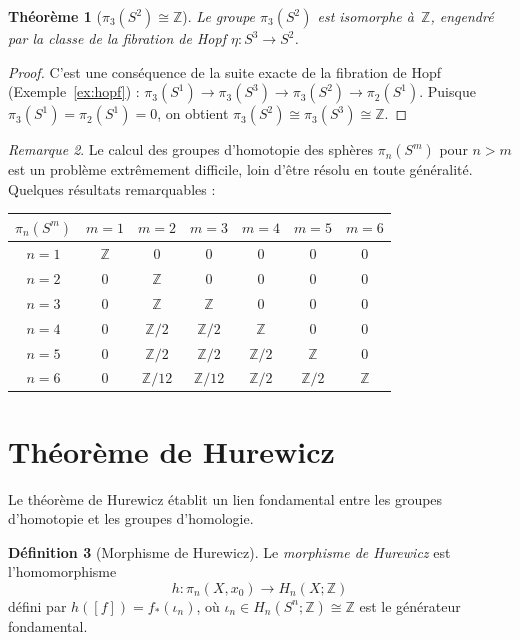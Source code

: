 \documentclass[12pt,a4paper,openany]{book}
\theoremstyle{definition}
\newtheorem{definition}{Définition}[chapter]
\theoremstyle{plain}
\newtheorem{theoreme}[definition]{Théorème}
\theoremstyle{remark}
\newtheorem{remarque}[definition]{Remarque}
\newcommand{\Z}{\mathbb{Z}}
\begin{document}
\begin{theoreme}[$\pi_3(S^2) \cong \Z$]\label{thm:pi3-s2}
  Le groupe $\pi_3(S^2)$ est isomorphe à~$\Z$, engendré par la classe de la
  fibration de Hopf $\eta \colon S^3 \to S^2$.
\end{theoreme}

\begin{proof}
  C'est une conséquence de la suite exacte de la fibration de Hopf
  (Exemple~\ref{ex:hopf}) :
  $\pi_3(S^1) \to \pi_3(S^3) \to \pi_3(S^2) \to \pi_2(S^1)$.
  Puisque $\pi_3(S^1) = \pi_2(S^1) = 0$, on obtient
  $\pi_3(S^2) \cong \pi_3(S^3) \cong \Z$.
\end{proof}

\begin{remarque}\label{rem:homotopie-spheres-difficile}
  Le calcul des groupes d'homotopie des sphères $\pi_n(S^m)$ pour $n > m$ est un
  problème extrêmement difficile, loin d'être résolu en toute généralité. Quelques
  résultats remarquables :
  \begin{center}
    \renewcommand{\arraystretch}{1.3}
    \begin{tabular}{c|cccccc}
      $\pi_n(S^m)$ & $m=1$ & $m=2$ & $m=3$ & $m=4$ & $m=5$ & $m=6$ \\ \hline
      $n = 1$ & $\Z$ & $0$ & $0$ & $0$ & $0$ & $0$ \\
      $n = 2$ & $0$ & $\Z$ & $0$ & $0$ & $0$ & $0$ \\
      $n = 3$ & $0$ & $\Z$ & $\Z$ & $0$ & $0$ & $0$ \\
      $n = 4$ & $0$ & $\Z/2$ & $\Z/2$ & $\Z$ & $0$ & $0$ \\
      $n = 5$ & $0$ & $\Z/2$ & $\Z/2$ & $\Z/2$ & $\Z$ & $0$ \\
      $n = 6$ & $0$ & $\Z/{12}$ & $\Z/{12}$ & $\Z/2$ & $\Z/2$ & $\Z$
    \end{tabular}
  \end{center}
\end{remarque}

\section{Théorème de Hurewicz}\label{sec:hurewicz}

Le théorème de Hurewicz établit un lien fondamental entre les groupes d'homotopie et
les groupes d'homologie.

\begin{definition}[Morphisme de Hurewicz]\label{def:morphisme-hurewicz}
  Le \emph{morphisme de Hurewicz} est l'homomorphisme
  \[
    h \colon \pi_n(X, x_0) \longrightarrow H_n(X; \Z)
  \]
  défini par $h([f]) = f_*(\iota_n)$, où $\iota_n \in H_n(S^n; \Z) \cong \Z$ est
  le générateur fondamental.
\end{definition}
\end{document}
